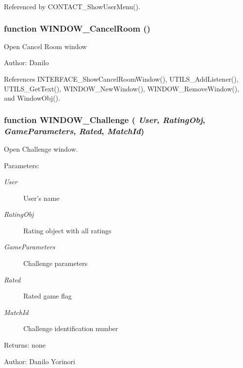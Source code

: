Referenced by CONTACT\_\-ShowUserMenu().
\subsubsection[WINDOW\_\-CancelRoom]{\setlength{\rightskip}{0pt plus 5cm}function WINDOW\_\-CancelRoom ()}\label{window_2window_8js_03cf2ff49b3e97f239cdb0eb00189f75}


Open Cancel Room window

\begin{Desc}
\item[Author:]Danilo \end{Desc}


References INTERFACE\_\-ShowCancelRoomWindow(), UTILS\_\-AddListener(), UTILS\_\-GetText(), WINDOW\_\-NewWindow(), WINDOW\_\-RemoveWindow(), and WindowObj().
\subsubsection[WINDOW\_\-Challenge]{\setlength{\rightskip}{0pt plus 5cm}function WINDOW\_\-Challenge ( {\em User}, \/   {\em RatingObj}, \/   {\em GameParameters}, \/   {\em Rated}, \/   {\em MatchId})}\label{window_2window_8js_da802ed448482380aee47a8eedccbea5}


Open Challenge window. 

\begin{Desc}
\item[Parameters:]
\begin{description}
\item[{\em User}]User's name \item[{\em RatingObj}]Rating object with all ratings \item[{\em GameParameters}]Challenge parameters \item[{\em Rated}]Rated game flag \item[{\em MatchId}]Challenge identification number \end{description}
\end{Desc}
\begin{Desc}
\item[Returns:]none \end{Desc}
\begin{Desc}
\item[Author:]Danilo Yorinori \end{Desc}



